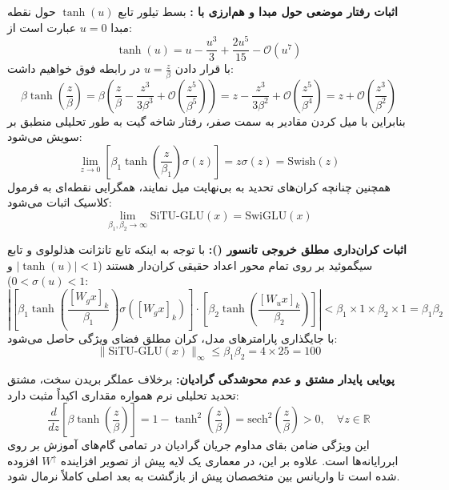 \textbf{اثبات رفتار موضعی حول مبدا و هم‌ارزی با :} بسط تیلور تابع $\tanh(u)$ حول نقطه مبدا $u = 0$ عبارت است از:
\begin{equation}
    \tanh(u) = u - \frac{u^3}{3} + \frac{2u^5}{15} - \mathcal{O}(u^7)
\end{equation}
با قرار دادن $u = \frac{z}{\beta}$ در رابطه فوق خواهیم داشت:
\begin{equation}
    \beta \tanh\left(\frac{z}{\beta}\right) = \beta \left( \frac{z}{\beta} - \frac{z^3}{3\beta^3} + \mathcal{O}\left(\frac{z^5}{\beta^5}\right) \right) = z - \frac{z^3}{3\beta^2} + \mathcal{O}\left(\frac{z^5}{\beta^4}\right) = z + \mathcal{O}\left(\frac{z^3}{\beta^2}\right)
\end{equation}
بنابراین با میل کردن مقادیر به سمت صفر، رفتار شاخه گیت به طور تحلیلی منطبق بر سویش می‌شود:
\begin{equation}
    \lim_{z \to 0} \left[ \beta_1 \tanh\left(\frac{z}{\beta_1}\right) \sigma(z) \right] = z \sigma(z) = \text{Swish}(z)
\end{equation}
همچنین چنانچه کران‌های تحدید به بی‌نهایت میل نمایند، همگرایی نقطه‌ای به فرمول کلاسیک اثبات می‌شود:
\begin{equation}
    \lim_{\beta_1, \beta_2 \to \infty} \text{SiTU-GLU}(x) = \text{SwiGLU}(x)
\end{equation}

\textbf{اثبات کران‌داری مطلق خروجی تانسور ():} با توجه به اینکه تابع تانژانت هذلولوی و تابع سیگموئید بر روی تمام محور اعداد حقیقی کران‌دار هستند ($|\tanh(u)| < 1$ و $0 < \sigma(u) < 1$):
\begin{equation}
    \left| \left[ \beta_1 \tanh\left(\frac{[W_g x]_k}{\beta_1}\right) \sigma([W_g x]_k) \right] \cdot \left[ \beta_2 \tanh\left(\frac{[W_u x]_k}{\beta_2}\right) \right] \right| < \beta_1 \times 1 \times \beta_2 \times 1 = \beta_1 \beta_2
\end{equation}
با جایگذاری پارامترهای مدل، کران مطلق فضای ویژگی حاصل می‌شود:
\begin{equation}
    \|\text{SiTU-GLU}(x)\|_\infty \le \beta_1 \beta_2 = 4 \times 25 = 100
\end{equation}

\textbf{پویایی پایدار مشتق و عدم محوشدگی گرادیان:} برخلاف عملگر بریدن سخت، مشتق تحدید تحلیلی نرم همواره مقداری اکیداً مثبت دارد:
\begin{equation}
    \frac{d}{dz}\left[ \beta \tanh\left(\frac{z}{\beta}\right) \right] = 1 - \tanh^2\left(\frac{z}{\beta}\right) = \text{sech}^2\left(\frac{z}{\beta}\right) > 0, \quad \forall z \in \mathbb{R}
\end{equation}
این ویژگی ضامن بقای مداوم جریان گرادیان در تمامی گام‌های آموزش بر روی ابررایانه‌ها است. علاوه بر این، در معماری  یک لایه  پیش از تصویر افزاینده $W^\uparrow$ افزوده شده است تا واریانس بین متخصصان پیش از بازگشت به بعد اصلی کاملاً نرمال شود.

